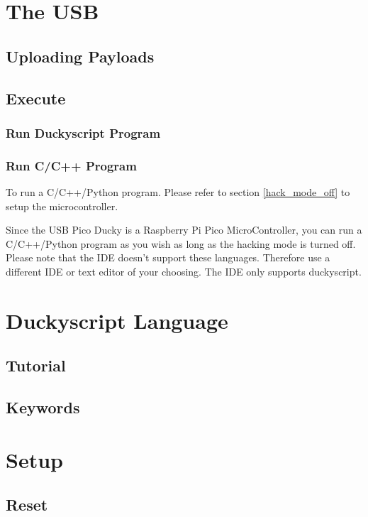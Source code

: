 \documentclass[a4paper,12pt]{article}
\begin{document}
\section{The USB}

\subsection{Uploading Payloads}\label{upload_payloads}

\subsection{Execute}

\subsubsection{Run Duckyscript Program}

\subsubsection{Run C/C++ Program}

To run a C/C++/Python program. Please refer to section \ref{hack_mode_off} to setup the microcontroller.

Since the USB Pico Ducky is a Raspberry Pi Pico MicroController, you can run a C/C++/Python program as you wish as long as the hacking mode is turned off. Please note that the IDE doesn't support these languages. Therefore use a different IDE or text editor of your choosing. The IDE only supports duckyscript.

\section{Duckyscript Language}

\subsection{Tutorial}

\subsection{Keywords}


\section{Setup}

\subsection{Reset}
\end{document}
